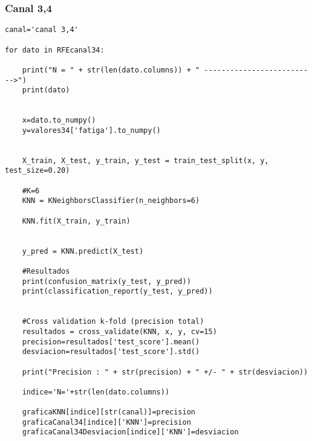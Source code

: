     \subsubsection{{Canal 3,4}}
\begin{lstlisting}
canal='canal 3,4'

for dato in RFEcanal34:
    
    print("N = " + str(len(dato.columns)) + " -------------------------->")
    print(dato)
    
    
    x=dato.to_numpy()
    y=valores34['fatiga'].to_numpy()
    
    
    X_train, X_test, y_train, y_test = train_test_split(x, y, test_size=0.20)

    #K=6
    KNN = KNeighborsClassifier(n_neighbors=6)
    
    KNN.fit(X_train, y_train)


    y_pred = KNN.predict(X_test)

    #Resultados
    print(confusion_matrix(y_test, y_pred))
    print(classification_report(y_test, y_pred))

    
    #Cross validation k-fold (precision total)
    resultados = cross_validate(KNN, x, y, cv=15)
    precision=resultados['test_score'].mean()
    desviacion=resultados['test_score'].std()
    
    print("Precision : " + str(precision) + " +/- " + str(desviacion))
    
    indice='N='+str(len(dato.columns))
    
    graficaKNN[indice][str(canal)]=precision
    graficaCanal34[indice]['KNN']=precision
    graficaCanal34Desviacion[indice]['KNN']=desviacion
\end{lstlisting}
    
